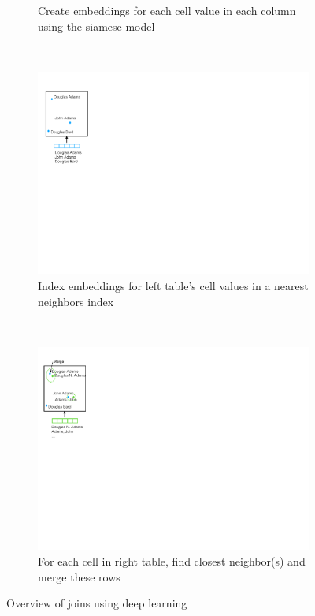 \begin{figure}[htb]
\begin{subfigure}[t]{0.24\linewidth}
        \caption{Create embeddings for each cell value in each column using the siamese model}
        \label{join2}
    \end{subfigure}
    ~ 
    \begin{subfigure}[t]{0.24\linewidth}
        \centering 
        \includegraphics[width=.9\linewidth]{join3}
        \caption{Index embeddings for left table's cell values in a nearest neighbors index}
        \label{join3}
    \end{subfigure}
    ~ 
    \begin{subfigure}[t]{0.24\linewidth}
        \centering 
        \includegraphics[width=.9\linewidth]{join4}
        \caption{For each cell in right table, find closest neighbor(s) and merge these rows}
        \label{join4}
    \end{subfigure}
    \caption{Overview of joins using deep learning}
    \label{join_fig}
\end{figure}


